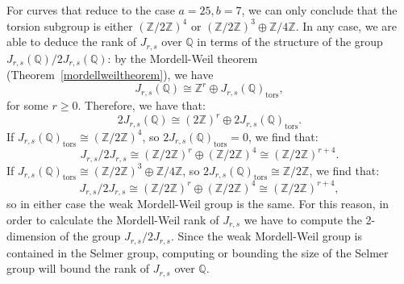 \documentclass[a4paper, 12pt]{amsart}
\theoremstyle{definition}
\theoremstyle{plain}
\theoremstyle{plain}
\theoremstyle{plain}
\theoremstyle{plain}
\theoremstyle{remark}
\theoremstyle{remark}
\theoremstyle{plain}
\newcommand{\thmref}[1]{Theorem~\ref{#1}}
\newcommand{\Q}{\mathbb{Q}}
\newcommand{\Z}{\mathbb{Z}}
\newcommand{\Zmod}[1]{\mathbb{Z}/#1\mathbb{Z}}
\begin{document}
	For curves that reduce to the case $a=25,b=7$, we can only conclude that the torsion subgroup is either $\left(\Zmod{2}\right)^4$ or $\left(\Zmod{2}\right)^3\oplus\Zmod{4}$. In any case, we are able to deduce the rank of $J_{r,s}$ over $\Q$ in terms of the structure of the group $J_{r,s}(\Q)/2J_{r,s}(\Q)$: by the Mordell-Weil theorem (\thmref{mordellweiltheorem}), we have
	\begin{equation*}
		J_{r,s}(\Q)\cong \Z^r\oplus J_{r,s}(\Q)_{\text{tors}},
	\end{equation*}
	for some $r\ge 0$. Therefore, we have that:
	\begin{equation*}
		2J_{r,s}(\Q)\cong (2\Z)^r\oplus 2J_{r,s}(\Q)_{\text{tors}}.
	\end{equation*}
	If $J_{r,s}(\Q)_{\text{tors}}\cong \left(\Zmod{2}\right)^4$, so $2J_{r,s}(\Q)_{\text{tors}}=0$, we find that:
	\begin{equation*}
		J_{r,s}/2J_{r,s}\cong (\Zmod{2})^r\oplus(\Zmod{2})^4\cong (\Zmod{2})^{r+4}.
	\end{equation*}
	If $J_{r,s}(\Q)_{\text{tors}}\cong \left(\Zmod{2}\right)^3\oplus\Zmod{4}$, so $2J_{r,s}(\Q)_{\text{tors}}\cong\Zmod{2}$, we find that:
	\begin{equation*}
		J_{r,s}/2J_{r,s}\cong (\Zmod{2})^r\oplus(\Zmod{2})^4\cong (\Zmod{2})^{r+4},
	\end{equation*}
	so in either case the weak Mordell-Weil group is the same. For this reason, in order to calculate the Mordell-Weil rank of $J_{r,s}$ we have to compute the 2-dimension of the group $J_{r,s}/2J_{r,s}$. Since the weak Mordell-Weil group is contained in the Selmer group, computing or bounding the size of the Selmer group will bound the rank of $J_{r,s}$ over $\Q$.
	
\end{document}
